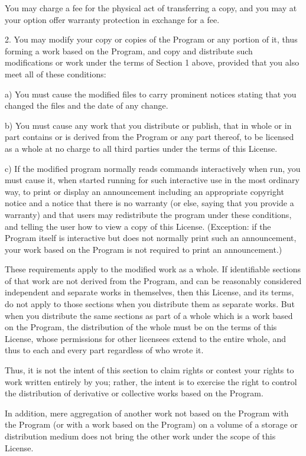 You may charge a fee for the physical act of transferring a copy, and
you may at your option offer warranty protection in exchange for a fee.

2. You may modify your copy or copies of the Program or any portion
of it, thus forming a work based on the Program, and copy and
distribute such modifications or work under the terms of Section 1
above, provided that you also meet all of these conditions:

a) You must cause the modified files to carry prominent notices
stating that you changed the files and the date of any change.

b) You must cause any work that you distribute or publish, that in
whole or in part contains or is derived from the Program or any
part thereof, to be licensed as a whole at no charge to all third
parties under the terms of this License.

c) If the modified program normally reads commands interactively
when run, you must cause it, when started running for such
interactive use in the most ordinary way, to print or display an
announcement including an appropriate copyright notice and a
notice that there is no warranty (or else, saying that you provide
a warranty) and that users may redistribute the program under
these conditions, and telling the user how to view a copy of this
License.  (Exception: if the Program itself is interactive but
does not normally print such an announcement, your work based on
the Program is not required to print an announcement.)

These requirements apply to the modified work as a whole.  If
identifiable sections of that work are not derived from the Program,
and can be reasonably considered independent and separate works in
themselves, then this License, and its terms, do not apply to those
sections when you distribute them as separate works.  But when you
distribute the same sections as part of a whole which is a work based
on the Program, the distribution of the whole must be on the terms of
this License, whose permissions for other licensees extend to the
entire whole, and thus to each and every part regardless of who wrote it.

Thus, it is not the intent of this section to claim rights or contest
your rights to work written entirely by you; rather, the intent is to
exercise the right to control the distribution of derivative or
collective works based on the Program.

In addition, mere aggregation of another work not based on the Program
with the Program (or with a work based on the Program) on a volume of
a storage or distribution medium does not bring the other work under
the scope of this License.

